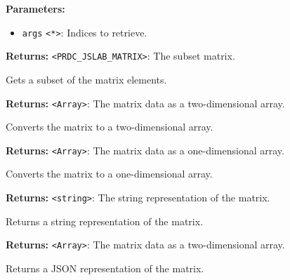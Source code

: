 \documentclass[12pt,a4paper]{article}
\begin{document}
\noindent \textbf{Parameters:}
\begin{itemize}
  \item \texttt{args} \texttt{<*>}: Indices to retrieve.
\end{itemize}

\noindent \textbf{Returns:} \texttt{<PRDC\_JSLAB\_MATRIX>}: The subset matrix.

\noindent Gets a subset of the matrix elements.

\vspace{5mm}
\noindent {}


\noindent \textbf{Returns:} \texttt{<Array>}: The matrix data as a two-dimensional array.

\noindent Converts the matrix to a two-dimensional array.

\vspace{5mm}
\noindent {}


\noindent \textbf{Returns:} \texttt{<Array>}: The matrix data as a one-dimensional array.

\noindent Converts the matrix to a one-dimensional array.

\vspace{5mm}
\noindent {}


\noindent \textbf{Returns:} \texttt{<string>}: The string representation of the matrix.

\noindent Returns a string representation of the matrix.

\vspace{5mm}
\noindent {}


\noindent \textbf{Returns:} \texttt{<Array>}: The matrix data as a two-dimensional array.

\noindent Returns a JSON representation of the matrix.

\vspace{5mm}
\noindent {}
\end{document}
